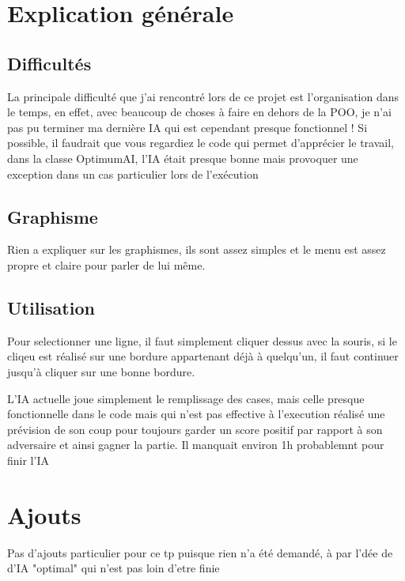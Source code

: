 \documentclass[a4paper]{article}
\date{19 Janvier 2017}
\begin{document}
\entete

\section{Explication générale}



\subsection{Difficultés}

La principale difficulté que j'ai rencontré lors de ce projet est l'organisation dans le temps, en effet, avec beaucoup de choses à faire en dehors de la POO, je n'ai pas pu terminer ma dernière IA qui est cependant presque fonctionnel ! Si possible, il faudrait que vous regardiez le code qui permet d'apprécier le travail, dans la classe OptimumAI, l'IA était presque bonne mais provoquer une exception dans un cas particulier lors de l'exécution

\subsection{Graphisme}

Rien a expliquer sur les graphismes, ils sont assez simples et le menu est assez propre et claire pour parler de lui même. 


\subsection{Utilisation}

Pour selectionner une ligne, il faut simplement cliquer dessus avec la souris, si le cliqeu est réalisé sur une bordure appartenant déjà à quelqu'un, il faut continuer jusqu'à cliquer sur une bonne bordure.

L'IA actuelle joue simplement le remplissage des cases, mais celle presque fonctionnelle dans le code mais qui n'est pas effective à l'execution réalisé une prévision de son coup pour toujours garder un score positif par rapport à son adversaire et ainsi gagner la partie. Il manquait environ 1h probablemnt pour finir l'IA

\section{Ajouts}

Pas d'ajouts particulier pour ce tp puisque rien n'a été demandé, à par l'dée de d'IA "optimal" qui n'est pas loin d'etre finie
\end{document}
